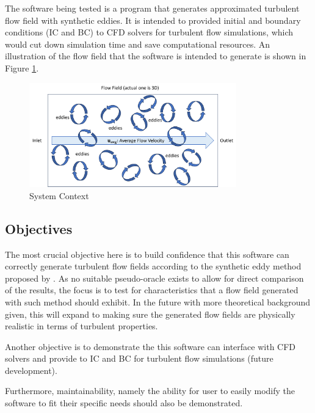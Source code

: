 \documentclass[12pt, titlepage]{article}
\begin{document}
The software being tested is a program that generates approximated turbulent flow field with synthetic eddies. It is intended to provided initial and boundary conditions (IC and BC) to CFD solvers for turbulent flow simulations, which would cut down simulation time and save computational resources. An illustration of the flow field that the software is intended to generate is shown in Figure \ref{Fig_PhysicalSystem}.

\begin{figure}[h!]
  \begin{center}
   \includegraphics[width=0.8\textwidth]{PS.png}
  \caption{System Context}
  \label{Fig_PhysicalSystem} 
  \end{center}
\end{figure}



\subsection{Objectives}

The most crucial objective here is to build confidence that this software can correctly generate turbulent flow fields according to the synthetic eddy method proposed by \cite{PolettoEtAl2013}. As no suitable pseudo-oracle exists to allow for direct comparison of the results, the focus is to test for characteristics that a flow field generated with such method should exhibit. In the future with more theoretical background given, this will expand to making sure the generated flow fields are physically realistic in terms of turbulent properties. 

Another objective is to demonstrate the this software can interface with CFD solvers and provide to IC and BC for turbulent flow simulations (future development).

Furthermore, maintainability, namely the ability for user to easily modify the software to fit their specific needs should also be demonstrated.
\end{document}
